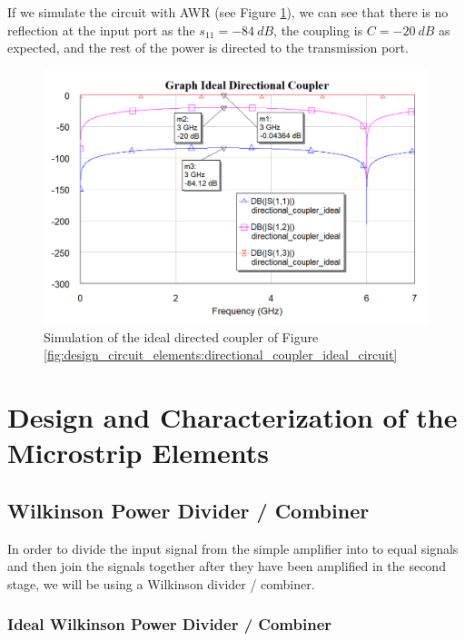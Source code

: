 \documentclass[12pt]{report} %
\begin{document}
If we simulate the circuit with AWR (see Figure \ref{fig:design_circuit_elements:directional_coupler_ideal_graph}), we can see that there is no reflection at the input port as the $s_{11} = -84 \ dB$, the coupling is $C = -20 \ dB$ as expected, and the rest of the power is directed to the transmission port.

\begin{figure}[htbp]
    \centering
    \includegraphics[width=\linewidth]{images//design_circuit_elements/directional_coupler_ideal_graph.png}
    \caption{Simulation of the ideal directed coupler of Figure \ref{fig:design_circuit_elements:directional_coupler_ideal_circuit}}
    \label{fig:design_circuit_elements:directional_coupler_ideal_graph}
\end{figure}

\chapter{Design and Characterization of the Microstrip Elements}

\section{Wilkinson Power Divider / Combiner}

In order to divide the input signal from the simple amplifier into to equal signals and then join the signals together after they have been amplified in the second stage, we will be using a Wilkinson divider / combiner.

\subsection{Ideal Wilkinson Power Divider / Combiner}
\end{document}

